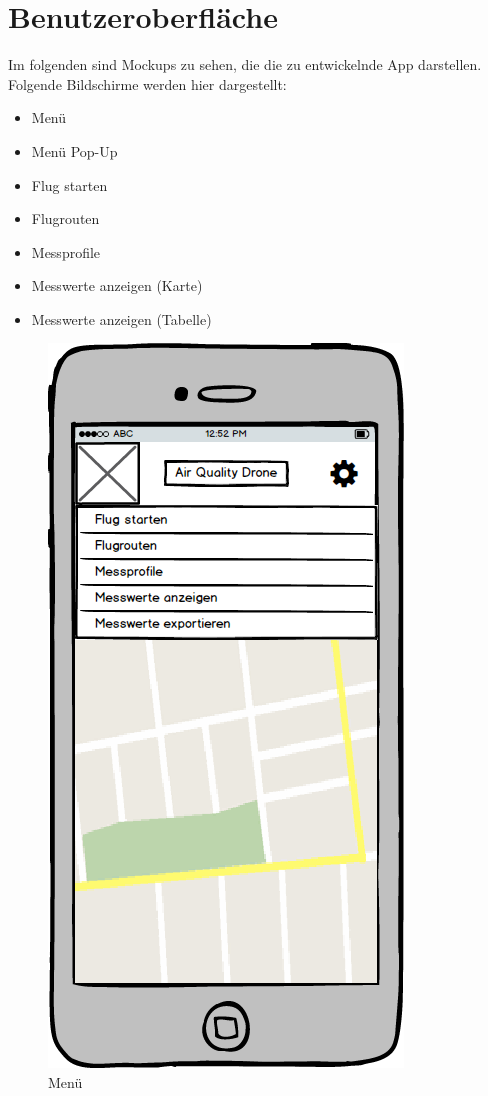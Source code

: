 


\chapter{Benutzeroberfläche}\label{cha:Benutzeroberfläche}
Im folgenden sind Mockups zu sehen, die die zu entwickelnde App darstellen.
Folgende Bildschirme werden hier dargestellt:
\begin{itemize}
	\item Menü
	\item Menü Pop-Up
	\item Flug starten
	\item Flugrouten
	\item Messprofile
	\item Messwerte anzeigen (Karte)
	\item Messwerte anzeigen (Tabelle)
\end{itemize}

\begin{figure}
	\centering
	\includegraphics[scale=0.8]{images/Menue}
	\caption{Menü}
\end{figure}
\newpage

